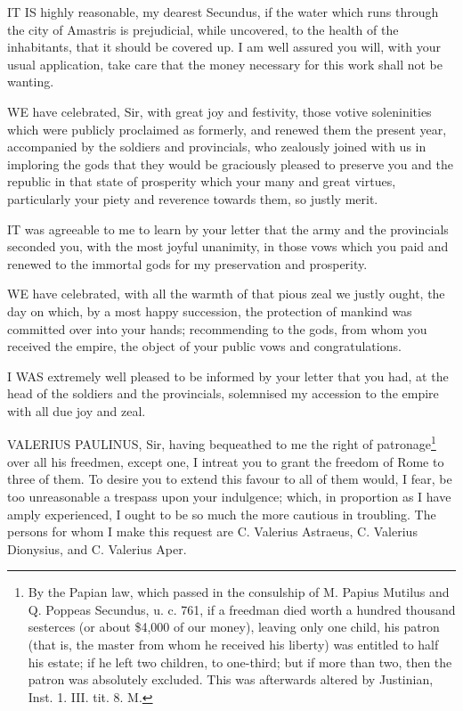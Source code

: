 
IT IS highly reasonable, my dearest Secundus, if the water which runs
through the city of Amastris is prejudicial, while uncovered, to the
health of the inhabitants, that it should be covered up. I am well assured
you will, with your usual application, take care that the money necessary
for this work shall not be wanting.


WE have celebrated, Sir, with great joy and festivity, those votive
soleninities which were publicly proclaimed as formerly, and renewed them
the present year, accompanied by the soldiers and provincials, who
zealously joined with us in imploring the gods that they would be
graciously pleased to preserve you and the republic in that state of
prosperity which your many and great virtues, particularly your piety and
reverence towards them, so justly merit.


IT was agreeable to me to learn by your letter that the army and the
provincials seconded you, with the most joyful unanimity, in those vows
which you paid and renewed to the immortal gods for my preservation and
prosperity.


WE have celebrated, with all the warmth of that pious zeal we justly
ought, the day on which, by a most happy succession, the protection of
mankind was committed over into your hands; recommending to the gods, from
whom you received the empire, the object of your public vows and
congratulations.


I WAS extremely well pleased to be informed by your letter that you had,
at the head of the soldiers and the provincials, solemnised my accession
to the empire with all due joy and zeal.


VALERIUS PAULINUS, Sir, having bequeathed to me the right of patronage\footnote{By the Papian law,
which passed in the consulship of M. Papius Mutilus and Q. Poppeas
Secundus, u. c. 761, if a freedman died worth a hundred thousand sesterces
(or about \$4,000 of our money), leaving only one child, his patron (that
is, the master from whom he received his liberty) was entitled to half his
estate; if he left two children, to one-third; but if more than two, then
the patron was absolutely excluded. This was afterwards altered by
Justinian, Inst. 1. III. tit. 8. M.}
over all his freedmen, except one, I intreat you to grant the freedom of
Rome to three of them. To desire you to extend this favour to all of them
would, I fear, be too unreasonable a trespass upon your indulgence; which,
in proportion as I have amply experienced, I ought to be so much the more
cautious in troubling. The persons for whom I make this request are C.
Valerius Astraeus, C. Valerius Dionysius, and C. Valerius Aper.

